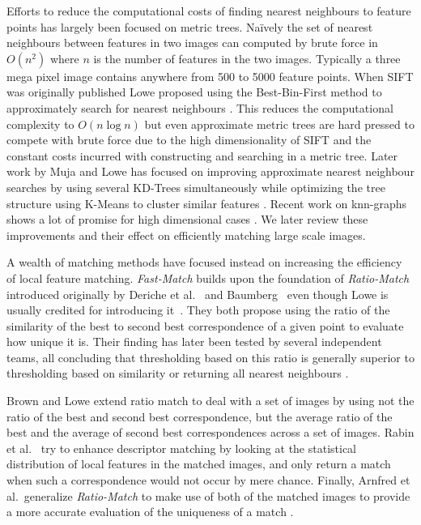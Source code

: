 \documentclass[runningheads]{llncs}
\begin{document}
Efforts to reduce the computational costs of finding nearest neighbours to feature points has largely been focused on metric trees. Na\"ively the set of nearest neighbours between features in two images can computed by brute force in $O(n^2)$ where $n$ is the number of features in the two images. Typically a three mega pixel image contains anywhere from 500 to 5000 feature points. When SIFT was originally published Lowe proposed using the Best-Bin-First method to approximately search for nearest neighbours \cite{beis1997shape,lowe1999object}. This reduces the computational complexity to $O(n\log n)$ but even approximate metric trees are hard pressed to compete with brute force due to the high dimensionality of SIFT and the constant costs incurred with constructing and searching in a metric tree. Later work by Muja and Lowe has focused on improving approximate nearest neighbour searches by using several KD-Trees simultaneously while optimizing the tree structure using K-Means to cluster similar features \cite{muja2009fast}. Recent work on knn-graphs shows a lot of promise for high dimensional cases \cite{dong2011efficient}. We later review these improvements and their effect on efficiently matching large scale images.

A wealth of matching methods have focused instead on increasing the efficiency of local feature matching. \emph{Fast-Match} builds upon the foundation of \emph{Ratio-Match} introduced originally by Deriche et al.~\cite{deriche1994robust} and Baumberg~\cite{baumberg2000reliable} even though Lowe is usually credited for introducing it~\cite{lowe2004sift}. They both propose using the ratio of the similarity of the best to second best correspondence of a given point to evaluate how unique it is. Their finding has later been tested by several independent teams, all concluding that thresholding based on this ratio is generally superior to thresholding based on similarity or returning all nearest neighbours \cite{lowe2004sift,mikolajczyk2005performance,moreels2007evaluation,rabin2009statistical}.

Brown and Lowe \cite{brown2005multi} extend ratio match to deal with a set of images by using not the ratio of the best and second best correspondence, but the average ratio of the best and the average of second best correspondences across a set of images.  Rabin et al.\ \cite{rabin2009statistical} try to enhance descriptor matching by looking at the statistical distribution of local features in the matched images, and only return a match when such a correspondence would not occur by mere chance. Finally, Arnfred et al.\ generalize \emph{Ratio-Match} to make use of both of the matched images to provide a more accurate evaluation of the uniqueness of a match \cite{arnfred2013mirror}.
\end{document}
